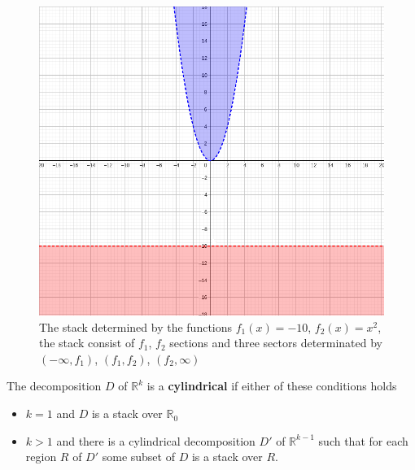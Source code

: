 \documentclass[
  digital, %
  twoside, %
  table,   %
  nolof,     %
  nolot,     %
]{fithesis3}
\begin{document}
\begin{figure}[H]
  \begin{center}
      \begin{minipage}{0.4\textwidth}
          \includegraphics[width=\textwidth]{fithesis/images/stack.png}
    \end{minipage}
  \end{center}
  \caption{The stack determined by the functions $f_1(x) = -10$, $f_2(x) = x^2$, the stack consist of $f_1$, $f_2$ sections and three sectors determinated by $(-\infty, f_1)$, $(f_1, f_2)$, $(f_2, \infty)$}
\end{figure}


\begin{definition}
The decomposition $D$ of $\mathbb{R}^k$ is a \textbf{cylindrical} if either of these conditions holds
\begin{itemize}
  \itemsep0em 
    \item  $k = 1$ and $D$ is a stack over $\mathbb{R}_0$
    \item $k > 1$ and there is a cylindrical decomposition $D'$ of $\mathbb{R}^{k-1}$ such that for each region $R$ of $D'$ some subset of $D$ is a stack over $R$. 
\end{itemize}
\end{definition}
\end{document}
